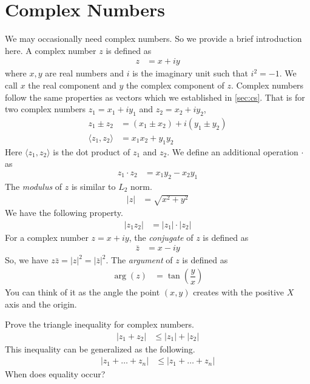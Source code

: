 \documentclass[inequalities.tex]{subfile}
\begin{document}
	\section{Complex Numbers}
	We may occasionally need complex numbers. So we provide a brief introduction here. A complex number $z$ is defined as
		\begin{align*}
			z
				& = x+iy
		\end{align*}
	where $x,y$ are real numbers and $i$ is the imaginary unit such that $i^{2}=-1$. We call $x$ the real component and $y$ the complex component of $z$. Complex numbers follow the same properties as vectors which we established in \autoref{sec:cs}. That is for two complex numbers $z_{1}=x_{1}+iy_{1}$ and $z_{2}=x_{2}+iy_{2}$,
		\begin{align*}
			z_{1}\pm z_{2}
				& = (x_{1}\pm x_{2})+i(y_{1}\pm y_{2})\\
			\langle z_{1},z_{2}\rangle
				& = x_{1}x_{2}+y_{1}y_{2}
		\end{align*}
	Here $\langle z_{1},z_{2}\rangle$ is the dot product of $z_{1}$ and $z_{2}$. We define an additional operation $\cdot$ as
		\begin{align*}
			z_{1}\cdot z_{2}
				& = x_{1}y_{2}-x_{2}y_{1}
		\end{align*}
	The \textit{modulus} of $z$ is similar to $L_{2}$ norm.
		\begin{align*}
			|z|
				& = \sqrt{x^{2}+y^{2}}
		\end{align*}
	We have the following property.
		\begin{align*}
			|z_{1}z_{2}|
				& = |z_{1}|\cdot|z_{2}|
		\end{align*}
	For a complex number $z=x+iy$, the \textit{conjugate} of $z$ is defined as
		\begin{align*}
			\bar{z}
				& = x-iy
		\end{align*}
	So, we have $z\bar{z}=|z|^{2}=|\bar{z}|^{2}$. The \textit{argument} of $z$ is defined as
		\begin{align*}
			\arg(z)
				& = \tan\left(\dfrac{y}{x}\right)
		\end{align*}
	You can think of it as the angle the point $(x,y)$ creates with the positive $X$ axis and the origin.
		\begin{problem}
			Prove the triangle inequality for complex numbers.
				\begin{align*}
					|z_{1}+z_{2}|
						& \leq |z_{1}|+|z_{2}|
				\end{align*}
			This inequality can be generalized as the following.
				\begin{align*}
					|z_{1}+\ldots+z_{n}|
						& \leq |z_{1}+\ldots+z_{n}|
				\end{align*}
			When does equality occur?
		\end{problem}
\end{document}
